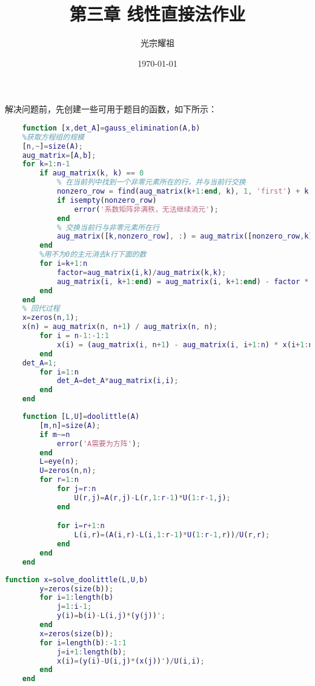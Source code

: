 \documentclass{ctexart}
\title{{\kaishu 第三章 线性直接法作业}}
\author{{\kaishu 光宗耀祖}}
\date{\today}
\begin{document}
\maketitle

解决问题前，先创建一些可用于题目的函数，如下所示：
\begin{lstlisting}[caption=Guass消去法解方程组函数, language=matlab]
    %高斯消去法解方程组
    function [x,det_A]=gauss_elimination(A,b)
    %获取方程组的规模
    [n,~]=size(A);
    aug_matrix=[A,b];
    for k=1:n-1
        if aug_matrix(k, k) == 0
            % 在当前列中找到一个非零元素所在的行，并与当前行交换
            nonzero_row = find(aug_matrix(k+1:end, k), 1, 'first') + k;
            if isempty(nonzero_row)
                error('系数矩阵非满秩，无法继续消元');
            end
            % 交换当前行与非零元素所在行
            aug_matrix([k,nonzero_row], :) = aug_matrix([nonzero_row,k], :);
        end
        %用不为0的主元消去k行下面的数
        for i=k+1:n
            factor=aug_matrix(i,k)/aug_matrix(k,k);
            aug_matrix(i, k+1:end) = aug_matrix(i, k+1:end) - factor * aug_matrix(k, k+1:end);
        end
    end
    % 回代过程
    x=zeros(n,1);
    x(n) = aug_matrix(n, n+1) / aug_matrix(n, n);
        for i = n-1:-1:1
            x(i) = (aug_matrix(i, n+1) - aug_matrix(i, i+1:n) * x(i+1:n)) / aug_matrix(i, i);
        end
    det_A=1;
        for i=1:n
            det_A=det_A*aug_matrix(i,i);
        end
    end
\end{lstlisting}
\begin{lstlisting}[caption=Doolittle分解函数, language=matlab]
    %对矩阵A进行doolittle分解
    function [L,U]=doolittle(A)
        [m,n]=size(A);
        if m~=n
            error('A需要为方阵');
        end
        L=eye(n);
        U=zeros(n,n);
        for r=1:n
            for j=r:n
                U(r,j)=A(r,j)-L(r,1:r-1)*U(1:r-1,j);
            end

            for i=r+1:n
                L(i,r)=(A(i,r)-L(i,1:r-1)*U(1:r-1,r))/U(r,r);
            end
        end
    end    
\end{lstlisting}
\begin{lstlisting}[caption=Doolittle分解法求解方程组函数, language=matlab]
    function x=solve_doolittle(L,U,b)
        y=zeros(size(b));
        for i=1:length(b)
            j=1:i-1;
            y(i)=b(i)-L(i,j)*(y(j))';
        end
        x=zeros(size(b));
        for i=length(b):-1:1
            j=i+1:length(b);
            x(i)=(y(i)-U(i,j)*(x(j))')/U(i,i);
        end
    end
\end{lstlisting}
\end{document}
